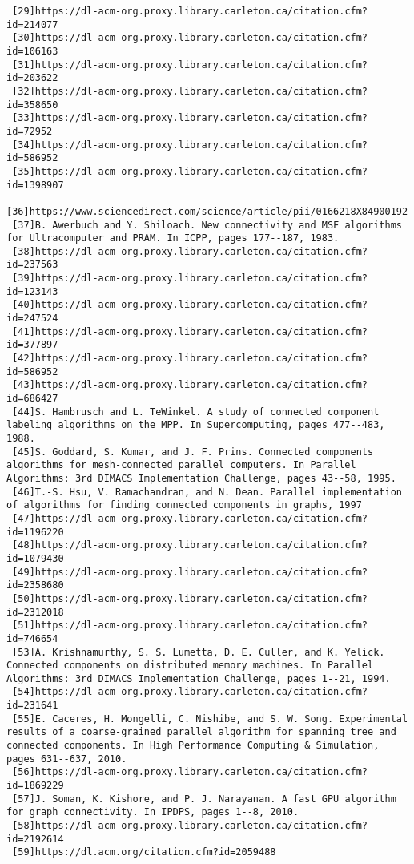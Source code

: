 \documentclass[]{article}
\begin{document}
\begin{verbatim}
 [29]https://dl-acm-org.proxy.library.carleton.ca/citation.cfm?id=214077
 [30]https://dl-acm-org.proxy.library.carleton.ca/citation.cfm?id=106163
 [31]https://dl-acm-org.proxy.library.carleton.ca/citation.cfm?id=203622
 [32]https://dl-acm-org.proxy.library.carleton.ca/citation.cfm?id=358650
 [33]https://dl-acm-org.proxy.library.carleton.ca/citation.cfm?id=72952
 [34]https://dl-acm-org.proxy.library.carleton.ca/citation.cfm?id=586952
 [35]https://dl-acm-org.proxy.library.carleton.ca/citation.cfm?id=1398907
 [36]https://www.sciencedirect.com/science/article/pii/0166218X84900192
 [37]B. Awerbuch and Y. Shiloach. New connectivity and MSF algorithms for Ultracomputer and PRAM. In ICPP, pages 177--187, 1983.
 [38]https://dl-acm-org.proxy.library.carleton.ca/citation.cfm?id=237563
 [39]https://dl-acm-org.proxy.library.carleton.ca/citation.cfm?id=123143
 [40]https://dl-acm-org.proxy.library.carleton.ca/citation.cfm?id=247524
 [41]https://dl-acm-org.proxy.library.carleton.ca/citation.cfm?id=377897
 [42]https://dl-acm-org.proxy.library.carleton.ca/citation.cfm?id=586952
 [43]https://dl-acm-org.proxy.library.carleton.ca/citation.cfm?id=686427
 [44]S. Hambrusch and L. TeWinkel. A study of connected component labeling algorithms on the MPP. In Supercomputing, pages 477--483, 1988.
 [45]S. Goddard, S. Kumar, and J. F. Prins. Connected components algorithms for mesh-connected parallel computers. In Parallel Algorithms: 3rd DIMACS Implementation Challenge, pages 43--58, 1995.
 [46]T.-S. Hsu, V. Ramachandran, and N. Dean. Parallel implementation of algorithms for finding connected components in graphs, 1997
 [47]https://dl-acm-org.proxy.library.carleton.ca/citation.cfm?id=1196220
 [48]https://dl-acm-org.proxy.library.carleton.ca/citation.cfm?id=1079430
 [49]https://dl-acm-org.proxy.library.carleton.ca/citation.cfm?id=2358680
 [50]https://dl-acm-org.proxy.library.carleton.ca/citation.cfm?id=2312018
 [51]https://dl-acm-org.proxy.library.carleton.ca/citation.cfm?id=746654
 [53]A. Krishnamurthy, S. S. Lumetta, D. E. Culler, and K. Yelick. Connected components on distributed memory machines. In Parallel Algorithms: 3rd DIMACS Implementation Challenge, pages 1--21, 1994.
 [54]https://dl-acm-org.proxy.library.carleton.ca/citation.cfm?id=231641
 [55]E. Caceres, H. Mongelli, C. Nishibe, and S. W. Song. Experimental results of a coarse-grained parallel algorithm for spanning tree and connected components. In High Performance Computing & Simulation, pages 631--637, 2010.
 [56]https://dl-acm-org.proxy.library.carleton.ca/citation.cfm?id=1869229
 [57]J. Soman, K. Kishore, and P. J. Narayanan. A fast GPU algorithm for graph connectivity. In IPDPS, pages 1--8, 2010.
 [58]https://dl-acm-org.proxy.library.carleton.ca/citation.cfm?id=2192614
 [59]https://dl.acm.org/citation.cfm?id=2059488
  \end{verbatim}
\end{document}
